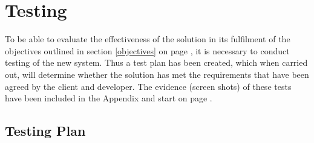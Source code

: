 \chapter{Testing}
To be able to evaluate the effectiveness of the solution in its fulfilment of the objectives outlined in section \ref{objectives} on page \pageref{objectives}, it is necessary to conduct testing of the new system. Thus a test plan has been created, which when carried out, will determine whether the solution has met the requirements that have been agreed by the client and developer. The evidence (screen shots) of these tests have been included in the Appendix and start on page \pageref{appendix}.
\section{Testing Plan}
\footnotesize
